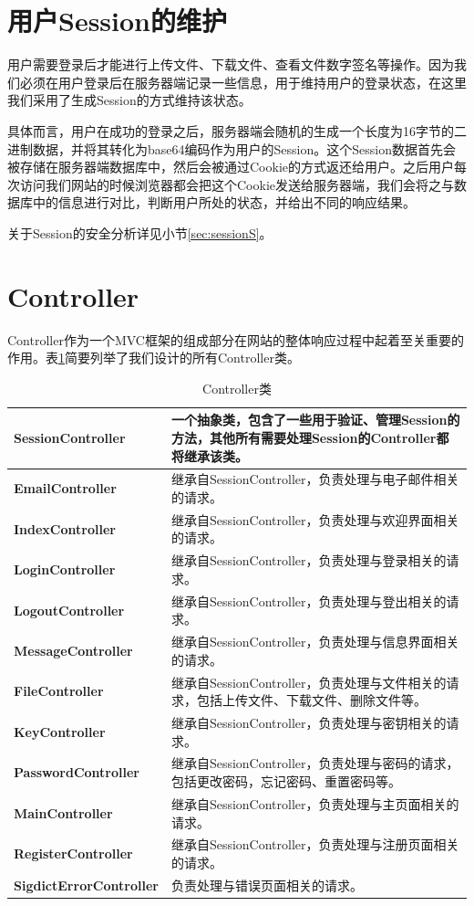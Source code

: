 \section{用户Session的维护}

用户需要登录后才能进行上传文件、下载文件、查看文件数字签名等操作。因为我们必须在用户登录后在服务器端记录一些信息，用于维持用户的登录状态，在这里我们采用了生成Session的方式维持该状态。

具体而言，用户在成功的登录之后，服务器端会随机的生成一个长度为16字节的二进制数据，并将其转化为base64编码\cite{base64}作为用户的Session。这个Session数据首先会被存储在服务器端数据库中，然后会被通过Cookie\cite{cookie}的方式返还给用户。之后用户每次访问我们网站的时候浏览器都会把这个Cookie发送给服务器端，我们会将之与数据库中的信息进行对比，判断用户所处的状态，并给出不同的响应结果。

关于Session的安全分析详见小节\ref{sec:sessionS}。

\section{Controller}\label{sec:controllerP}

Controller作为一个MVC框架的组成部分在网站的整体响应过程中起着至关重要的作用。表\ref{tab:controller}简要列举了我们设计的所有Controller类。

\begin{table}[ht]
\centering
\caption{Controller类}
\begin{tabular}{>{\bfseries}lp{9cm}}
\toprule
SessionController & 
一个抽象类，包含了一些用于验证、管理Session的方法，其他所有需要处理Session的Controller都将继承该类。\\
\midrule
EmailController & 
继承自SessionController，负责处理与电子邮件相关的请求。\\
\midrule
IndexController & 
继承自SessionController，负责处理与欢迎界面相关的请求。\\
\midrule
LoginController &
继承自SessionController，负责处理与登录相关的请求。\\
\midrule
LogoutController &
继承自SessionController，负责处理与登出相关的请求。\\
\midrule
MessageController &
继承自SessionController，负责处理与信息界面相关的请求。\\
\midrule
FileController &
继承自SessionController，负责处理与文件相关的请求，包括上传文件、下载文件、删除文件等。\\
\midrule
KeyController &
继承自SessionController，负责处理与密钥相关的请求。\\
\midrule
PasswordController &
继承自SessionController，负责处理与密码的请求，包括更改密码，忘记密码、重置密码等。\\
\midrule
MainController &
继承自SessionController，负责处理与主页面相关的请求。\\
\midrule
RegisterController &
继承自SessionController，负责处理与注册页面相关的请求。\\
\midrule
SigdictErrorController &
负责处理与错误页面相关的请求。\\
\bottomrule
\end{tabular}
\label{tab:controller}
\end{table}

